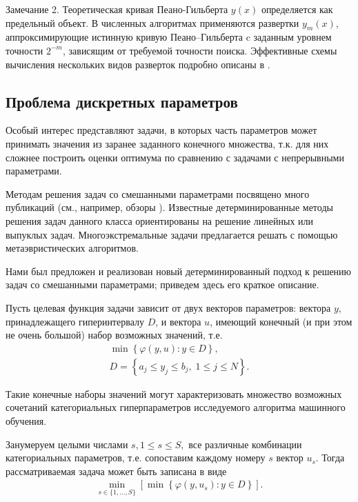 \documentclass[preprint,12pt]{elsarticle}
\begin{document}
Замечание 2. Теоретическая кривая Пеано-Гильберта $y(x)$ определяется как предельный объект. В численных алгоритмах применяются развертки $y_m(x)$, аппроксимирующие истинную кривую Пеано–Гильберта c заданным уровнем точности $2^{-m}$, зависящим от требуемой точности поиска. Эффективные схемы вычисления нескольких видов разверток подробно описаны в \cite{Sergeyev2013}.


\subsection{Проблема дискретных параметров} 

Особый интерес представляют задачи, в которых часть параметров может принимать значения из заранее заданного конечного множества, т.к. для них сложнее построить оценки оптимума по сравнению с задачами с непрерывными параметрами.

Методам решения задач со смешанными параметрами посвящено много публикаций (см., например, обзоры \cite{Burer2012,Boukouvala2016}). 
Известные детерминированные методы решения задач данного класса ориентированы на решение линейных или выпуклых задач.
Многоэкстремальные задачи предлагается решать с помощью метаэвристических алгоритмов.

Нами был предложен и реализован новый детерминированный подход к решению задач со смешанными параметрами; приведем здесь его краткое описание. 

Пусть  целевая функция задачи зависит от двух векторов параметров: вектора $y$, принадлежащего гиперинтервалу $D$, и вектора $u$, имеющий конечный (и при этом не очень большой) набор возможных значений, т.е. 
\begin{gather}\label{problem_i}
\min{\left\{ \varphi(y,u) : y\in D \right\}},\\
D=\left\{a_j \leq y_j \leq b_j, \; 1\leq j \leq N \right\}.\nonumber
\end{gather}

Такие конечные наборы значений могут характеризовать множество возможных сочетаний категориальных гиперпараметров исследуемого алгоритма машинного обучения. 

Занумеруем целыми числами $s, 1\leq s \leq S,$ все различные комбинации категориальных параметров, т.е. сопоставим каждому номеру $s$ вектор $u_s$. 
Тогда рассматриваемая задача может быть записана в виде 
\begin{gather}\label{problem_is}
 \min_{s\in\{1,...,S\}}\left[\min{\left\{ \varphi(y,u_s) : y\in D \right\}}\right].
\end{gather}
\end{document}
